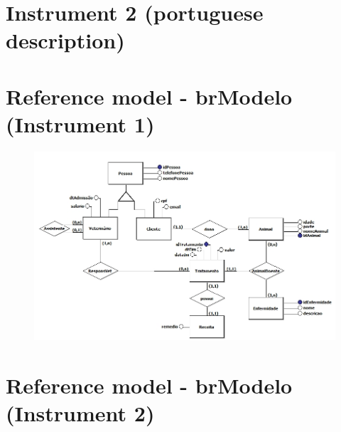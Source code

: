     \begin{figure}[!htb]
        \centering
         
    \end{figure}

\newpage

\section{Instrument 2 (portuguese description)} \label{ap:Inst2Exp}

    \begin{figure}[!htb]
        \centering
         
    \end{figure}

\newpage

\section{Reference model - brModelo (Instrument 1)}

\begin{figure}[!htb]
    \centering
    \includegraphics[scale=0.5]{postextuais/Instrument1 (brModelo Reference Model).jpg}
    \label{fig:referenceModelbrModeloInst1}
\end{figure}

\newpage

\section{Reference model - brModelo (Instrument 2)}

